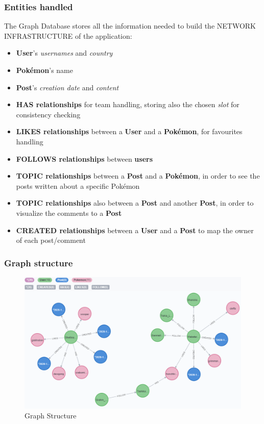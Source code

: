 \subsubsection{Entities handled}
The Graph Database stores all the information needed to build the NETWORK INFRASTRUCTURE of the application:
\begin{itemize}
	\item \textbf{User}’s \textit{usernames} and \textit{country}
	\item \textbf{Pokémon}’s name
	\item \textbf{Post}’s \textit{creation date} and \textit{content}
	\item \textbf{HAS relationships} for team handling, storing also the chosen \textit{slot} for consistency checking
	\item \textbf{LIKES relationships} between a \textbf{User} and a \textbf{Pokémon}, for favourites handling
	\item \textbf{FOLLOWS relationships} between \textbf{users}
	\item \textbf{TOPIC relationships} between a \textbf{Post} and a \textbf{Pokémon}, in order to see the posts written about a specific Pokémon
	\item \textbf{TOPIC relationships} also between a \textbf{Post} and another \textbf{Post}, in order to visualize the comments to a \textbf{Post}  
	\item \textbf{CREATED relationships} between a \textbf{User} and a \textbf{Post} to map the owner of each post/comment
\end{itemize}

\subsubsection{Graph structure}
\begin{figure}[H]
	\centering
	\includegraphics[width=\textwidth]{img/graph_structure.png}
	\caption{Graph Structure}
\end{figure}

